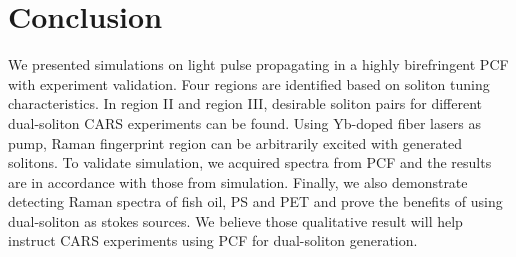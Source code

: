 \documentclass{osa-article}
\begin{document}
\section{Conclusion}     

We presented simulations on light pulse propagating in a highly birefringent PCF with experiment validation. Four regions are identified based on soliton tuning characteristics. In region II and region III, desirable soliton pairs for different dual-soliton CARS experiments can be found. Using Yb-doped fiber lasers as pump, Raman fingerprint region can be arbitrarily excited with generated solitons. To validate simulation, we acquired spectra from PCF and the results are in accordance with those from simulation. Finally, we also demonstrate detecting Raman spectra of fish oil, PS and PET and prove the benefits of using dual-soliton as stokes sources. We believe those qualitative result will help instruct CARS experiments using PCF for dual-soliton generation.





\end{document}
